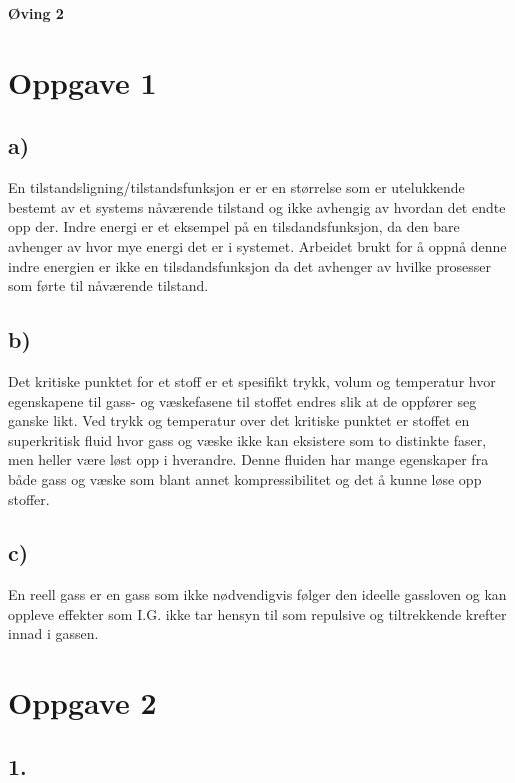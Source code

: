 \begin{center}
	\LARGE{\textbf{Øving 2}}
\end{center}


\section*{Oppgave 1}

\subsection*{a)}

En tilstandsligning/tilstandsfunksjon er er en størrelse som er utelukkende bestemt av et systems nåværende tilstand og ikke avhengig av hvordan det endte opp der. Indre energi er et eksempel på en tilsdandsfunksjon, da den bare avhenger av hvor mye energi det er i systemet. Arbeidet brukt for å oppnå denne indre energien er ikke en tilsdandsfunksjon da det avhenger av hvilke prosesser som førte til nåværende tilstand.


\subsection*{b)}

Det kritiske punktet for et stoff er et spesifikt trykk, volum og temperatur hvor egenskapene til gass- og væskefasene til stoffet endres slik at de oppfører seg ganske likt. Ved trykk og temperatur over det kritiske punktet er stoffet en superkritisk fluid hvor gass og væske ikke kan eksistere som to distinkte faser, men heller være løst opp i hverandre. Denne fluiden har mange egenskaper fra både gass og væske som blant annet kompressibilitet og det å kunne løse opp stoffer.


\subsection*{c)}

En reell gass er en gass som ikke nødvendigvis følger den ideelle gassloven og kan oppleve effekter som I.G. ikke tar hensyn til som repulsive og tiltrekkende krefter innad i gassen.


\newpage


\section*{Oppgave 2}

\subsection*{1.}

